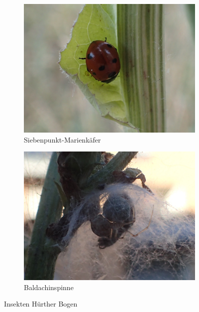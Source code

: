 \documentclass[11pt]{article}
\begin{document}
\begin{figure}[h!]
\begin{subfigure}[b]{0.44\linewidth}
    \includegraphics[width=\linewidth]{img/bogen/siebenpunkt.jpg}
    \caption{Siebenpunkt-Marienkäfer}
  \end{subfigure}
  \begin{subfigure}[b]{0.44\linewidth}
    \includegraphics[width=\linewidth]{img/bogen/trapezspinne.jpg}
    \caption{Baldachinspinne}
  \end{subfigure}
  \caption{Insekten Hürther Bogen}
\end{figure}

\clearpage
\end{document}
